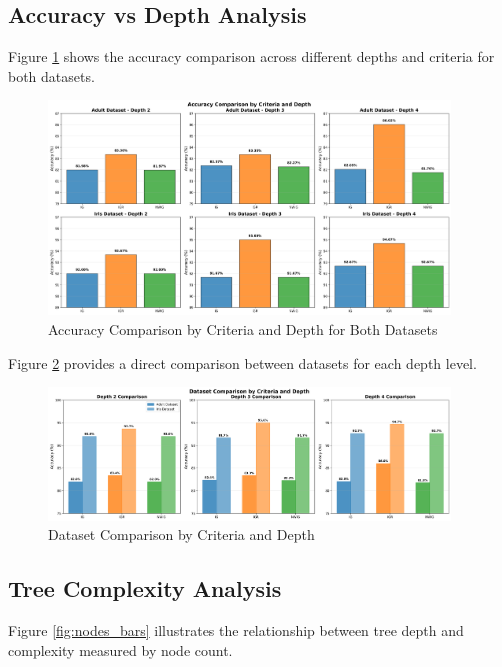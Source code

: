 \documentclass{article}
\begin{document}
\subsection{Accuracy vs Depth Analysis}

Figure \ref{fig:accuracy_bars} shows the accuracy comparison across different depths and criteria for both datasets.

\begin{figure}[H]
\centering
\includegraphics[width=0.95\textwidth]{accuracy_bar_plots_by_depth.png}
\caption{Accuracy Comparison by Criteria and Depth for Both Datasets}
\label{fig:accuracy_bars}
\end{figure}

Figure \ref{fig:accuracy_combined} provides a direct comparison between datasets for each depth level.

\begin{figure}[H]
\centering
\includegraphics[width=0.95\textwidth]{combined_bar_comparison_by_depth.png}
\caption{Dataset Comparison by Criteria and Depth}
\label{fig:accuracy_combined}
\end{figure}

\subsection{Tree Complexity Analysis}

Figure \ref{fig:nodes_bars} illustrates the relationship between tree depth and complexity measured by node count.
\end{document}
